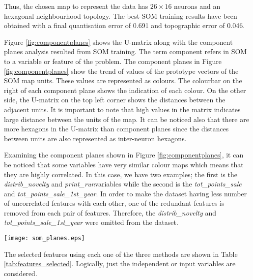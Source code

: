 \documentclass[a4paper,10pt,twocolumn,preprint,3p]{elsarticle}
\begin{document}
Thus, the chosen map to represent the data has $26 \times 16$ neurons and an hexagonal neighbourhood topology.  The best SOM training results have been obtained with a final quantisation error of 0.691 and topographic error of 0.046.

Figure \ref{fig:componentplanes} shows the U-matrix along with the component planes analysis resulted from SOM training. The term component refers in SOM to a variable or feature of the problem.
The component planes in Figure \ref{fig:componentplanes} show the trend of values of the prototype vectors of the SOM map units. These values are represented as colours. The colourbar on the right of each component plane shows the indication of each colour. On the other side, the U-matrix on the top
left corner shows the distances between the adjacent units. It is
important to note that high values in the matrix indicates large
distance between the units of the map. It can be noticed also that
there are more hexagons in the U-matrix than component planes since
the distances between units are also represented as inter-neuron hexagons. 

Examining the component planes shown in Figure \ref{fig:componentplanes}, it can be noticed that some variables have very similar colour maps which means that they are highly correlated. In this case, we have two examples; the first is the \emph{distrib\_novelty} and \emph{print\_run}variables while the second is the \emph{tot\_points\_sale} and \emph{tot\_points\_sale\_1st\_year}. In order to make the dataset having less number of uncorrelated features with each other, one of the redundant features is removed from each pair of features. Therefore, the \emph{distrib\_novelty} and \emph{tot\_points\_sale\_1st\_year} were omitted from the dataset.


\begin{figure*}[ht]
\begin{center}
\texttt{[image: som\_planes.eps]}
\end{center}
\caption{U-matrix and component planes.}
\label{fig:componentplanes}
\end{figure*}


The selected features using each one of the three methods are shown in 
Table \ref{tab:features_selected}. 
Logically, just the independent or input variables are considered.
\end{document}
